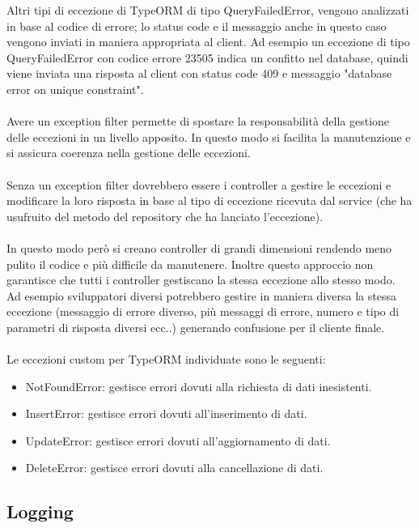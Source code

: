 Altri tipi di eccezione di TypeORM di tipo QueryFailedError, vengono analizzati in base al codice di errore; 
lo status code e il messaggio anche in questo caso vengono inviati in maniera appropriata al client.
Ad esempio un eccezione di tipo QueryFailedError con codice errore 23505 indica un confitto nel database, quindi
viene inviata una risposta al client con status code 409 e messaggio "database error on unique constraint".
\\\\
Avere un exception filter permette di spostare la responsabilità della gestione delle eccezioni in un livello
apposito. In questo modo si facilita la manutenzione e si assicura coerenza nella gestione delle eccezioni.
\\\\
Senza un exception filter dovrebbero essere i controller a gestire le eccezioni e modificare la loro risposta
in base al tipo di eccezione ricevuta dal service (che ha usufruito del metodo del repository che ha lanciato
l'eccezione).
\\\\
In questo modo però si creano controller di grandi dimensioni rendendo meno pulito il codice e più difficile
da manutenere. Inoltre questo approccio non garantisce che tutti i controller gestiscano la stessa eccezione
allo stesso modo. 
\\
Ad esempio sviluppatori diversi potrebbero gestire in maniera diversa la stessa eccezione (messaggio di errore diverso,
più messaggi di errore, numero e tipo di parametri di risposta diversi ecc..)
generando confusione per il cliente finale.
\\\\
Le eccezioni custom per TypeORM individuate sono le seguenti:
\begin{itemize}
    \item NotFoundError: gestisce errori dovuti alla richiesta di dati inesistenti.
    \item InsertError: gestisce errori dovuti all'inserimento di dati.
    \item UpdateError: gestisce errori dovuti all'aggiornamento di dati.
    \item DeleteError: gestisce errori dovuti alla cancellazione di dati.
\end{itemize}
\leavevmode\newline

\subsection{Logging}
